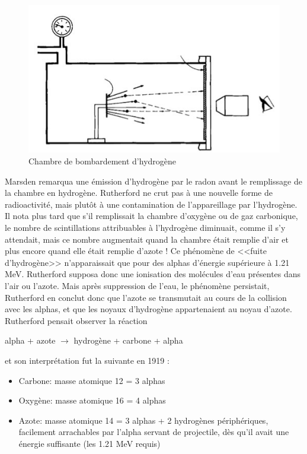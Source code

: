\begin{figure}[ht]
    \centering
    \includegraphics[scale=0.75]{Images1/bombardement.PNG}
    \caption{Chambre de bombardement d'hydrogène}
    \label{fig:chambre_bombardement_H}
\end{figure}

Marsden remarqua une émission d'hydrogène par le radon avant le remplissage de la chambre en hydrogène. Rutherford ne crut pas à une nouvelle forme de radioactivité, mais plutôt à une contamination de l'appareillage par l'hydrogène. Il nota plus tard que s'il remplissait la chambre d'oxygène ou de gaz carbonique, le nombre de scintillations attribuables à l'hydrogène diminuait, comme il s'y attendait, mais ce nombre augmentait quand la chambre était remplie d'air et plus encore quand elle était remplie d'azote ! Ce phénomène de <<fuite d'hydrogène>> n'apparaissait que pour des alphas d'énergie supérieure à 1.21 \si{MeV}. Rutherford supposa donc une ionisation des molécules d'eau présentes dans l'air ou l'azote. Mais après suppression de l'eau, le phénomène persistait, Rutherford en conclut donc que l'azote se transmutait au cours de la collision avec les alphas, et que les noyaux d'hydrogène appartenaient au noyau d'azote. Rutherford pensait observer la réaction
\begin{center}
    alpha + azote $\longrightarrow$ hydrogène + carbone + alpha
\end{center}
et son interprétation fut la suivante en 1919 :

\begin{itemize}
    \item Carbone: masse atomique 12 = 3 alphas
    \item Oxygène: masse atomique 16 = 4 alphas
    \item Azote: masse atomique 14 = 3 alphas + 2 hydrogènes périphériques, facilement arrachables par l’alpha servant de projectile, dès qu’il avait une énergie suffisante (les 1.21 \si{MeV} requis)
\end{itemize}

